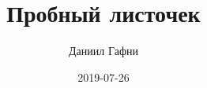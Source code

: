 \documentclass{article}%
\title{Пробный листочек}%
\author{Даниил Гафни}%
\date{2019{-}07{-}26}%
\begin{document}
%
\normalsize%
\maketitle%
\end{document}
